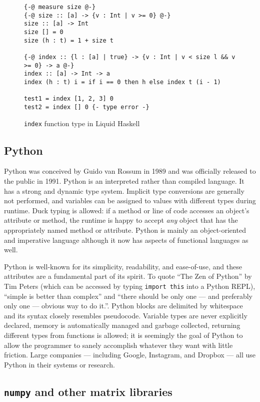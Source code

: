 \documentclass{book}
\begin{document}
\begin{figure}
    \centering
    \begin{verbatim}
{-@ measure size @-}
{-@ size :: [a] -> {v : Int | v >= 0} @-}
size :: [a] -> Int
size [] = 0
size (h : t) = 1 + size t

{-@ index :: {l : [a] | true} -> {v : Int | v < size l && v >= 0} -> a @-}
index :: [a] -> Int -> a
index (h : t) i = if i == 0 then h else index t (i - 1)

test1 = index [1, 2, 3] 0
test2 = index [] 0 {- type error -}\end{verbatim}
    \caption{\texttt{index} function type in Liquid Haskell}
    \label{lh-type-indexing}
\end{figure}


\subsection{Python}

Python was conceived by Guido van Rossum in 1989 and was officially released to the public in 1991. Python is an interpreted rather than compiled language. It has a strong and dynamic type system. Implicit type conversions are generally not performed, and variables can be assigned to values with different types during runtime. Duck typing is allowed: if a method or line of code accesses an object's attribute or method, the runtime is happy to accept \textit{any} object that has the appropriately named method or attribute. Python is mainly an object-oriented and imperative language although it now has aspects of functional languages as well.

Python is well-known for its simplicity, readability, and ease-of-use, and these attributes are a fundamental part of its spirit. To quote ``The Zen of Python'' by Tim Peters (which can be accessed by typing \texttt{import this} into a Python REPL), ``simple is better than complex'' and ``there should be only one --- and preferably only one --- obvious way to do it.''. Python blocks are delimited by whitespace and its syntax closely resembles pseudocode. Variable types are never explicitly declared, memory is automatically managed and garbage collected, returning different types from functions is allowed; it is seemingly the goal of Python to allow the programmer to sanely accomplish whatever they want with little friction. Large companies --- including Google, Instagram, and Dropbox --- all use Python in their systems or research.

\subsection{\texttt{numpy} and other matrix libraries}
\end{document}
